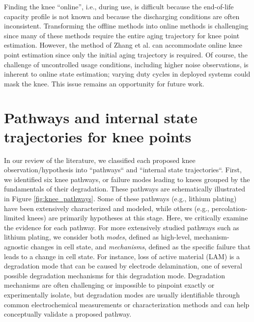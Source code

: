 \documentclass[journal=jpclcd,manuscript=article]{achemso}
\begin{document}
Finding the knee ``online'', i.e., during use, is difficult because the end-of-life capacity profile is not known and because the discharging conditions are often inconsistent. Transforming the offline methods into online methods is challenging since many of these methods require the entire aging trajectory for knee point estimation. However, the method of Zhang et al.\cite{zhang_accelerated_2019} can accommodate online knee point estimation since only the initial aging trajectory is required. Of course, the challenge of uncontrolled usage conditions, including higher noise observations\cite{aitio_predicting_2021}, is inherent to online state estimation; varying duty cycles in deployed systems could mask the knee. This issue remains an opportunity for future work.



\section{Pathways and internal state trajectories for knee points}

In our review of the literature, we classified each proposed knee observation/hypothesis into ``pathways`` and ``internal state trajectories``.
First, we identified six knee pathways, or failure modes leading to knees grouped by the fundamentals of their degradation. These pathways are schematically illustrated in Figure \ref{fig:knee_pathways}. Some of these pathways (e.g., lithium plating) have been extensively characterized and modeled, while others (e.g., percolation-limited knees) are primarily hypotheses at this stage. Here, we critically examine the evidence for each pathway. For more extensively studied pathways such as lithium plating, we consider both \textit{modes}, defined as high-level, mechanism-agnostic changes in cell state, and \textit{mechanisms}, defined as the specific failure that leads to a change in cell state. For instance, loss of active material (LAM) is a degradation mode that can be caused by electrode delamination, one of several possible degradation mechanisms for this degradation mode. Degradation mechanisms are often challenging or impossible to pinpoint exactly or experimentally isolate, but degradation modes are usually identifiable through common electrochemical measurements or characterization methods and can help conceptually validate a proposed pathway.
\end{document}
